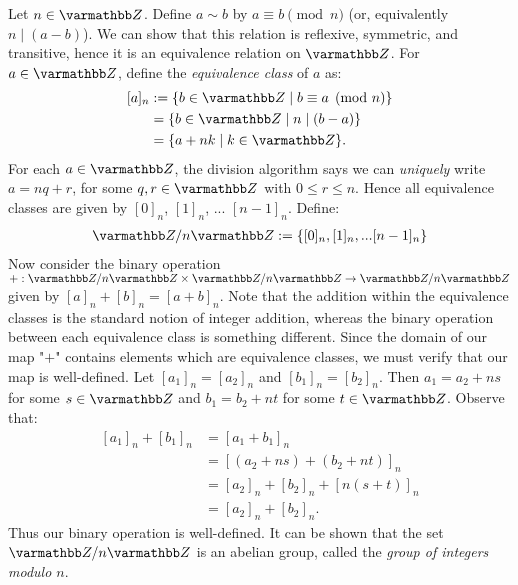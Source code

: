     \begin{example}\label{example:mod-group}
        Let $n \in \bfZ$. Define $a \sim b$ by $a \equiv b \pmod{n}$ (or, equivalently $n \mid (a-b)$). We can show that this relation is reflexive, symmetric, and transitive, hence it is an equivalence relation on $\bfZ$. For $a \in \bfZ$, define the \textit{equivalence class} of $a$ as:
            \begin{equation*}
            \begin{split}
                [a]_n 
                & := \{b \in \bfZ \mid b \equiv a \pmod{n}\} \\
                & = \{b \in \bfZ \mid n \mid (b-a) \} \\
                & = \{a + nk \mid k \in \bfZ\}.
            \end{split}
            \end{equation*}
        For each $a \in \bfZ$, the division algorithm says we can \textit{uniquely} write $a = nq + r$, for some $q,r \in \bfZ$ with $0 \leq r \leq n$. Hence all equivalence classes are given by $[0]_n$, $[1]_n$, ... $[n-1]_n$. Define:
            \begin{equation*}
            \begin{split}
                \bfZ/n\bfZ := \{[0]_n, [1]_n, ... [n-1]_n\}
            \end{split}
            \end{equation*}
        Now consider the binary operation $+:\bfZ/n\bfZ \times \bfZ/n\bfZ \rightarrow \bfZ/n\bfZ$ given by $[a]_n + [b]_n = [a+b]_n$. Note that the addition within the equivalence classes is the standard notion of integer addition, whereas the binary operation between each equivalence class is something different. Since the domain of our map "$+$" contains elements which are equivalence classes, we must verify that our map is well-defined. Let $[a_1]_n = [a_2]_n$ and $[b_1]_n = [b_2]_n$. Then $a_1 = a_2 + ns$ for some $s \in \bfZ$ and $b_1 = b_2 + nt$ for some $t \in \bfZ$. Observe that:
            \begin{equation*}
            \begin{split}
                [a_1]_n + [b_1]_n 
                & = [a_1 + b_1]_n \\
                & = [(a_2 + ns) + (b_2 + nt)]_n \\
                & = [a_2]_n + [b_2]_n + [n(s+t)]_n \\
                & = [a_2]_n + [b_2]_n.
            \end{split}
            \end{equation*}
        Thus our binary operation is well-defined. It can be shown that the set $\bfZ/n\bfZ$ is an abelian group, called the \textit{group of integers modulo $n$}.
    \end{example}

